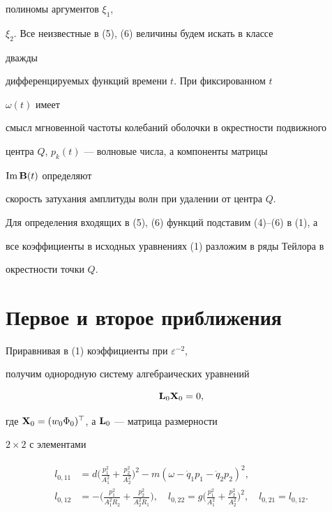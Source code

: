 полиномы аргументов $\xi_1$, 


$\xi_2$. Все неизвестные в (5), (6) величины будем искать в классе 


дважды 


дифференцируемых функций времени $t$. При фиксированном $t$\; 


$\omega(t)$ имеет 


смысл мгновенной частоты колебаний оболочки в окрестности подвижного 


центра $Q$, $p_k(t)$ --- волновые числа, а компоненты матрицы 


$\operatorname{Im} \bold B(t)$ определяют 


скорость затухания амплитуды волн при удалении от центра $Q$. 


 


Для определения входящих в (5), (6) функций подставим (4)--(6) в (1), а 


все коэффициенты в исходных уравнениях (1) разложим в ряды Тейлора в 


окрестности точки $Q$.


 


\section{Первое и второе приближения} 


 


Приравнивая в (1) коэффициенты при $\varepsilon^{-2}$, 


получим однородную систему алгебраических уравнений 


\begin{equation} 


\BL_0\BX_0=0, 


\end{equation} 


где $\bold X_0=(w_0\Phi_0)^\top$, а $\bold L_0$ --- матрица размерности 


$2\times 2$ с элементами


\begin{gather} 


\begin{split} 


l_{0,11}&=d\biggl(\frac{p^2_1}{A^2_1}+ 


\frac{p^2_2}{A^2_2}\biggr)^2-m(\omega-\Dot q_1p_1- 


\dot q_2p_2)^2,\\ 


%


l_{0,12}&=-\biggl(\frac{p^2_1}{A^2_1R_2}+ 


\frac{p^2_2}{A^2_2R_1}\biggr),\quad 


l_{0,22}=g\biggl(\frac{p^2_1}{A^2_1}+ 


\frac{p^2_2}{A^2_2}\biggr)^2,\quad l_{0,21}=l_{0,12}. 


\end{split} 


\end{gather} 



